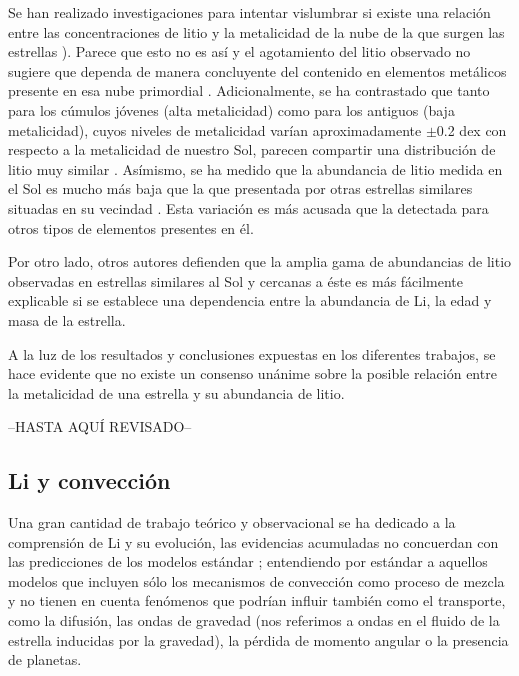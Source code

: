 Se han realizado investigaciones para intentar vislumbrar si existe una relación entre las concentraciones de litio y la metalicidad de la nube de la que surgen las estrellas \citep{Pinsonneault1997, BarradoyNavascues2001}). Parece que esto no es así y el agotamiento del litio observado no sugiere que dependa de manera concluyente del contenido en elementos metálicos presente en esa nube primordial \citep{Guiglion2016}. Adicionalmente, se ha contrastado que tanto para los cúmulos jóvenes (alta metalicidad) como para los antiguos (baja metalicidad), cuyos niveles de metalicidad varían aproximadamente $\pm$0.2 dex con respecto a la metalicidad de nuestro Sol, parecen compartir una distribución de litio muy similar \citep{Sestito2005}. Asímismo, se ha medido que la abundancia de litio medida en el Sol es mucho más baja que la que presentada por otras estrellas similares situadas en su vecindad \citep{Reddy2003}. Esta variación es más acusada que la detectada para otros tipos de elementos presentes en él.\par

Por otro lado, otros autores \citep{Sestito2005} defienden que la amplia gama de abundancias de litio observadas en estrellas similares al Sol y cercanas a éste es más fácilmente explicable si se establece una dependencia entre la abundancia de Li, la edad y masa de la estrella.\par

A la luz de los resultados y conclusiones expuestas en los diferentes trabajos, se hace evidente que no existe un consenso unánime sobre la posible relación entre la metalicidad de una estrella y su abundancia de litio.\par

--HASTA AQUÍ REVISADO--

\subsection{Li y convección}
Una gran cantidad de trabajo teórico y observacional se ha dedicado a la comprensión de Li y su evolución, las evidencias acumuladas no concuerdan con las predicciones de los modelos estándar \cite{Sestito2005}; entendiendo por estándar a aquellos modelos que incluyen sólo los mecanismos de convección como proceso de mezcla y no tienen en cuenta fenómenos que podrían influir también como el transporte, como la difusión, las ondas de gravedad (nos referimos a ondas en el fluido de la estrella inducidas por la gravedad), la pérdida de momento angular o la presencia de planetas.\par


